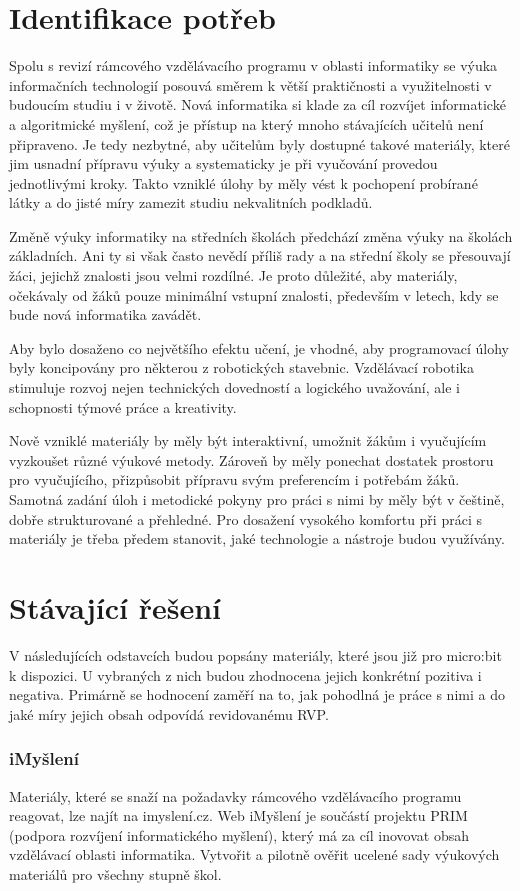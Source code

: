 \documentclass[
  digital,     %
  oneside,     %
  nosansbold,  %
  colorbold, %
  lof,         %
  nolot,         %
]{fithesis4}
\begin{document}
\section{Identifikace potřeb}
Spolu s revizí rámcového vzdělávacího programu v oblasti informatiky se výuka informačních technologií posouvá směrem k větší praktičnosti a využitelnosti v budoucím studiu i v životě. Nová informatika si klade za cíl rozvíjet informatické a algoritmické myšlení, což je přístup na který mnoho stávajících učitelů není připraveno. Je tedy nezbytné, aby učitelům byly dostupné takové materiály, které jim usnadní přípravu výuky a systematicky je při vyučování provedou jednotlivými kroky. Takto vzniklé úlohy by měly vést k pochopení probírané látky a do jisté míry zamezit studiu nekvalitních podkladů.

Změně výuky informatiky na středních školách předchází změna výuky na školách základních. Ani ty si však často nevědí příliš rady a na střední školy se přesouvají žáci, jejichž znalosti jsou velmi rozdílné. Je proto důležité, aby materiály,  očekávaly od žáků pouze minimální vstupní znalosti, především v letech, kdy se bude nová informatika zavádět.

Aby bylo dosaženo co největšího efektu učení, je vhodné, aby programovací úlohy byly koncipovány pro některou z robotických stavebnic. Vzdělávací robotika stimuluje rozvoj nejen technických dovedností a logického uvažování, ale i schopnosti týmové práce a kreativity\cite{Souza18}. 

Nově vzniklé materiály by měly být interaktivní, umožnit žákům i vyučujícím vyzkoušet různé výukové metody. Zároveň by měly ponechat dostatek prostoru pro vyučujícího, přizpůsobit přípravu svým preferencím i potřebám žáků. Samotná zadání úloh i metodické pokyny pro práci s nimi by měly být v češtině, dobře strukturované a přehledné. Pro dosažení vysokého komfortu při práci s materiály je třeba předem stanovit, jaké technologie a nástroje budou využívány.

\section{Stávající řešení}
V následujících odstavcích budou popsány materiály, které jsou již pro micro:bit k dispozici. U vybraných z nich budou zhodnocena jejich konkrétní pozitiva i negativa. Primárně se hodnocení zaměří na to, jak pohodlná je práce s nimi a do jaké míry jejich obsah odpovídá revidovanému RVP. 

\subsubsection{iMyšlení}
Materiály, které se snaží na požadavky rámcového vzdělávacího programu reagovat, lze najít na imyslení.cz. Web iMyšlení je součástí projektu PRIM (podpora rozvíjení informatického myšlení), který má za cíl inovovat obsah vzdělávací oblasti informatika. Vytvořit a pilotně ověřit ucelené sady výukových materiálů pro všechny stupně škol. 
\end{document}
